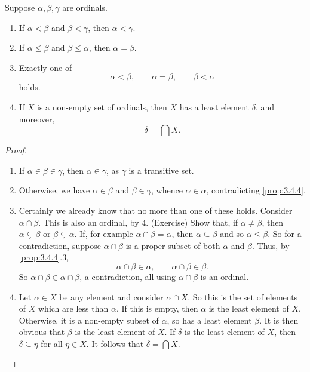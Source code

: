 \begin{theorem}
\label{thm:3.4.6}
Suppose $ \alpha, \beta, \gamma $ are ordinals.
\begin{enumerate}
\item If $ \alpha < \beta $ and $ \beta < \gamma $, then $ \alpha < \gamma $.
\item If $ \alpha \le \beta $ and $ \beta \le \alpha $, then $ \alpha = \beta $.
\item Exactly one of
$$ \alpha < \beta, \qquad \alpha = \beta, \qquad \beta < \alpha $$
holds.
\item If $ X $ is a non-empty set of ordinals, then $ X $ has a least element $ \delta $, and moreover,
$$ \delta = \bigcap X. $$
\end{enumerate}
\end{theorem}

\begin{proof}
\hfill
\begin{enumerate}
\item If $ \alpha \in \beta \in \gamma $, then $ \alpha \in \gamma $, as $ \gamma $ is a transitive set.
\item Otherwise, we have $ \alpha \in \beta $ and $ \beta \in \gamma $, whence $ \alpha \in \alpha $, contradicting \ref{prop:3.4.4}.
\item Certainly we already know that no more than one of these holds. Consider $ \alpha \cap \beta $. This is also an ordinal, by $ 4 $. (Exercise) Show that, if $ \alpha \ne \beta $, then $ \alpha \subsetneq \beta $ or $ \beta \subsetneq \alpha $. If, for example $ \alpha \cap \beta = \alpha $, then $ \alpha \subseteq \beta $ and so $ \alpha \le \beta $. So for a contradiction, suppose $ \alpha \cap \beta $ is a proper subset of both $ \alpha $ and $ \beta $. Thus, by \ref{prop:3.4.4}.$ 3 $,
$$ \alpha \cap \beta \in \alpha, \qquad \alpha \cap \beta \in \beta. $$
So $ \alpha \cap \beta \in \alpha \cap \beta $, a contradiction, all using $ \alpha \cap \beta $ is an ordinal.
\item Let $ \alpha \in X $ be any element and consider $ \alpha \cap X $. So this is the set of elements of $ X $ which are less than $ \alpha $. If this is empty, then $ \alpha $ is the least element of $ X $. Otherwise, it is a non-empty subset of $ \alpha $, so has a least element $ \beta $. It is then obvious that $ \beta $ is the least element of $ X $. If $ \delta $ is the least element of $ X $, then $ \delta \subseteq \eta $ for all $ \eta \in X $. It follows that $ \delta = \bigcap X $.
\end{enumerate}
\end{proof}

